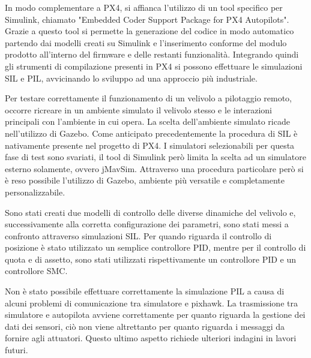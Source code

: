 In modo complementare a PX4, si affianca l'utilizzo di un tool specifico per Simulink, chiamato "Embedded Coder Support Package
for PX4 Autopilots". Grazie a questo tool si permette la generazione del codice in modo automatico partendo dai modelli creati su Simulink e l'inserimento conforme del modulo prodotto all'interno del firmware e delle restanti funzionalità. Integrando quindi gli strumenti di compilazione presenti in PX4 si possono effettuare le simulazioni SIL e PIL, avvicinando lo sviluppo ad una approccio più industriale.

Per testare correttamente il funzionamento di un velivolo a pilotaggio remoto, occorre ricreare in un ambiente simulato il velivolo stesso e le interazioni principali con l'ambiente in cui opera. La scelta dell'ambiente simulato ricade nell'utilizzo di Gazebo. Come anticipato precedentemente la procedura di SIL è nativamente presente nel progetto di PX4. I simulatori selezionabili per questa fase di test sono svariati, il tool di Simulink però limita la scelta ad un simulatore esterno solamente, ovvero jMavSim. Attraverso una procedura particolare però si è reso possibile l'utilizzo di Gazebo, ambiente più versatile e completamente personalizzabile.

Sono stati creati due modelli di controllo delle diverse dinamiche del velivolo e, successivamente alla corretta configurazione dei parametri, sono stati messi a confronto attraverso simulazioni SIL. Per quando riguarda il controllo di posizione è stato utilizzato un semplice controllore PID, mentre per il controllo di quota e di assetto, sono stati utilizzati rispettivamente un controllore PID e un controllore SMC. 

Non è stato possibile effettuare correttamente la simulazione PIL a causa di alcuni problemi di comunicazione tra simulatore e pixhawk. La trasmissione tra simulatore e autopilota avviene correttamente per quanto riguarda la gestione dei dati dei sensori, ciò non viene altrettanto per quanto riguarda i messaggi da fornire agli attuatori. Questo ultimo aspetto richiede ulteriori indagini in lavori futuri.